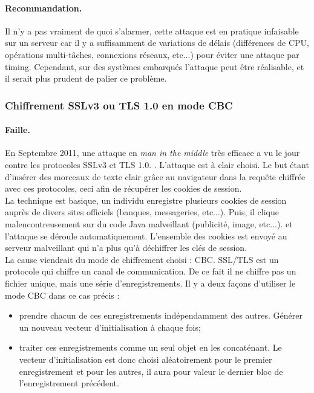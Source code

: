 \paragraph{Recommandation.\\}
Il n'y a pas vraiment de quoi s'alarmer, cette attaque est en pratique infaisable sur un serveur car il y a suffisamment de variations de délais (différences de CPU, opérations multi-tâches, connexions réseaux, etc...) pour éviter une attaque par timing. Cependant, sur des systèmes embarqués l'attaque peut être réalisable, et il serait plus prudent de palier ce problème.

\subsubsection{Chiffrement SSLv3 ou TLS 1.0 en mode CBC}
\paragraph{Faille.\\}
En Septembre 2011, une attaque en \textit{man in the middle} très efficace a vu le jour contre les protocoles SSLv3 et TLS 1.0. . L'attaque est à clair choisi. Le but étant d'insérer des morceaux de texte clair grâce au navigateur dans la requête chiffrée avec ces protocoles, ceci afin de récupérer les cookies de session.\\

La technique est basique, un individu enregistre plusieurs cookies de session auprès de divers sites officiels (banques, messageries, etc...). Puis, il clique malencontreusement sur du code Java malveillant (publicité, image, etc...). et l'attaque se déroule automatiquement. L'ensemble des cookies est envoyé au serveur malveillant qui n'a plus qu'à déchiffrer les clés de session.\\

La cause viendrait du mode de chiffrement choisi : CBC. SSL/TLS est un protocole qui chiffre un canal de communication. De ce fait il ne chiffre pas un fichier unique, mais une série d'enregistrements. Il y a deux façons d'utiliser le mode CBC dans ce cas précis :
\begin{itemize}
\item prendre chacun de ces enregistrements indépendamment des autres. Générer un nouveau vecteur d'initialisation à chaque fois;
\item traiter ces enregistrements comme un seul objet en les concaténant. Le vecteur d'initialisation est donc choisi aléatoirement pour le premier enregistrement et pour les autres, il aura pour valeur le dernier bloc de l'enregistrement précédent.\\

\end{itemize}

